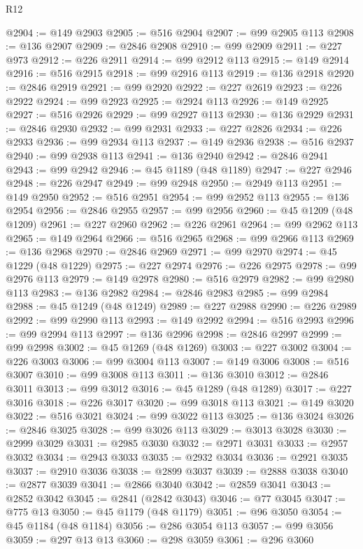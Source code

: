 \begin{lexlean}{R12}
\begin{coremodule}
@2904 := @149 @2903
@2905 := @516 @2904
@2907 := @99 @2905 @113
@2908 := @136 @2907
@2909 := @2846 @2908
@2910 := @99 @2909
@2911 := @227 @973
@2912 := @226 @2911
@2914 := @99 @2912 @113
@2915 := @149 @2914
@2916 := @516 @2915
@2918 := @99 @2916 @113
@2919 := @136 @2918
@2920 := @2846 @2919
@2921 := @99 @2920
@2922 := @227 @2619
@2923 := @226 @2922
@2924 := @99 @2923
@2925 := @2924 @113
@2926 := @149 @2925
@2927 := @516 @2926
@2929 := @99 @2927 @113
@2930 := @136 @2929
@2931 := @2846 @2930
@2932 := @99 @2931
@2933 := @227 @2826
@2934 := @226 @2933
@2936 := @99 @2934 @113
@2937 := @149 @2936
@2938 := @516 @2937
@2940 := @99 @2938 @113
@2941 := @136 @2940
@2942 := @2846 @2941
@2943 := @99 @2942
@2946 := @45 @1189 (@48 @1189)
@2947 := @227 @2946
@2948 := @226 @2947
@2949 := @99 @2948
@2950 := @2949 @113
@2951 := @149 @2950
@2952 := @516 @2951
@2954 := @99 @2952 @113
@2955 := @136 @2954
@2956 := @2846 @2955
@2957 := @99 @2956
@2960 := @45 @1209 (@48 @1209)
@2961 := @227 @2960
@2962 := @226 @2961
@2964 := @99 @2962 @113
@2965 := @149 @2964
@2966 := @516 @2965
@2968 := @99 @2966 @113
@2969 := @136 @2968
@2970 := @2846 @2969
@2971 := @99 @2970
@2974 := @45 @1229 (@48 @1229)
@2975 := @227 @2974
@2976 := @226 @2975
@2978 := @99 @2976 @113
@2979 := @149 @2978
@2980 := @516 @2979
@2982 := @99 @2980 @113
@2983 := @136 @2982
@2984 := @2846 @2983
@2985 := @99 @2984
@2988 := @45 @1249 (@48 @1249)
@2989 := @227 @2988
@2990 := @226 @2989
@2992 := @99 @2990 @113
@2993 := @149 @2992
@2994 := @516 @2993
@2996 := @99 @2994 @113
@2997 := @136 @2996
@2998 := @2846 @2997
@2999 := @99 @2998
@3002 := @45 @1269 (@48 @1269)
@3003 := @227 @3002
@3004 := @226 @3003
@3006 := @99 @3004 @113
@3007 := @149 @3006
@3008 := @516 @3007
@3010 := @99 @3008 @113
@3011 := @136 @3010
@3012 := @2846 @3011
@3013 := @99 @3012
@3016 := @45 @1289 (@48 @1289)
@3017 := @227 @3016
@3018 := @226 @3017
@3020 := @99 @3018 @113
@3021 := @149 @3020
@3022 := @516 @3021
@3024 := @99 @3022 @113
@3025 := @136 @3024
@3026 := @2846 @3025
@3028 := @99 @3026 @113
@3029 := @3013 @3028
@3030 := @2999 @3029
@3031 := @2985 @3030
@3032 := @2971 @3031
@3033 := @2957 @3032
@3034 := @2943 @3033
@3035 := @2932 @3034
@3036 := @2921 @3035
@3037 := @2910 @3036
@3038 := @2899 @3037
@3039 := @2888 @3038
@3040 := @2877 @3039
@3041 := @2866 @3040
@3042 := @2859 @3041
@3043 := @2852 @3042
@3045 := @2841 (@2842 @3043)
@3046 := @77 @3045
@3047 := @775 @13
@3050 := @45 @1179 (@48 @1179)
@3051 := @96 @3050
@3054 := @45 @1184 (@48 @1184)
@3056 := @286 @3054 @113
@3057 := @99 @3056
@3059 := @297 @13 @13
@3060 := @298 @3059
@3061 := @296 @3060

\end{coremodule}
\end{lexlean}
